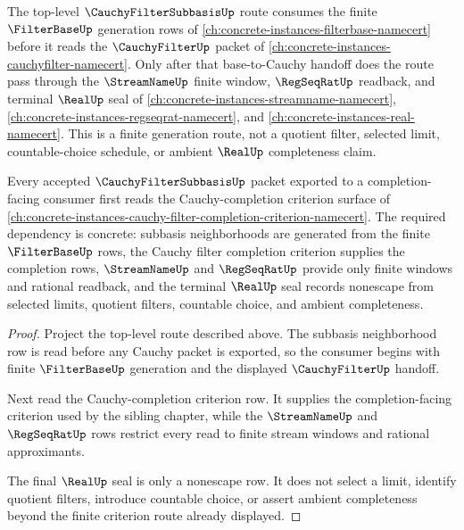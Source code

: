 The top-level $\CauchyFilterSubbasisUp$ route consumes the finite $\FilterBaseUp$ generation rows of \autoref{ch:concrete-instances-filterbase-namecert} before it reads the $\CauchyFilterUp$ packet of \autoref{ch:concrete-instances-cauchyfilter-namecert}. Only after that base-to-Cauchy handoff does the route pass through the $\StreamNameUp$ finite window, $\RegSeqRatUp$ readback, and terminal $\RealUp$ seal of \autoref{ch:concrete-instances-streamname-namecert}, \autoref{ch:concrete-instances-regseqrat-namecert}, and \autoref{ch:concrete-instances-real-namecert}. This is a finite generation route, not a quotient filter, selected limit, countable-choice schedule, or ambient $\RealUp$ completeness claim.

\begin{theorem}
\label{thm:cauchy-filter-subbasis-cauchy-completion-sibling-route}
Every accepted $\CauchyFilterSubbasisUp$ packet exported to a completion-facing consumer first reads the Cauchy-completion criterion surface of \autoref{ch:concrete-instances-cauchy-filter-completion-criterion-namecert}. The required dependency is concrete: subbasis neighborhoods are generated from the finite $\FilterBaseUp$ rows, the Cauchy filter completion criterion supplies the completion rows, $\StreamNameUp$ and $\RegSeqRatUp$ provide only finite windows and rational readback, and the terminal $\RealUp$ seal records nonescape from selected limits, quotient filters, countable choice, and ambient completeness.
\end{theorem}
\begin{proof}
Project the top-level route described above. The subbasis neighborhood row is read before any Cauchy packet is exported, so the consumer begins with finite $\FilterBaseUp$ generation and the displayed $\CauchyFilterUp$ handoff.

Next read the Cauchy-completion criterion row. It supplies the completion-facing criterion used by the sibling chapter, while the $\StreamNameUp$ and $\RegSeqRatUp$ rows restrict every read to finite stream windows and rational approximants.

The final $\RealUp$ seal is only a nonescape row. It does not select a limit, identify quotient filters, introduce countable choice, or assert ambient completeness beyond the finite criterion route already displayed.
\end{proof}

